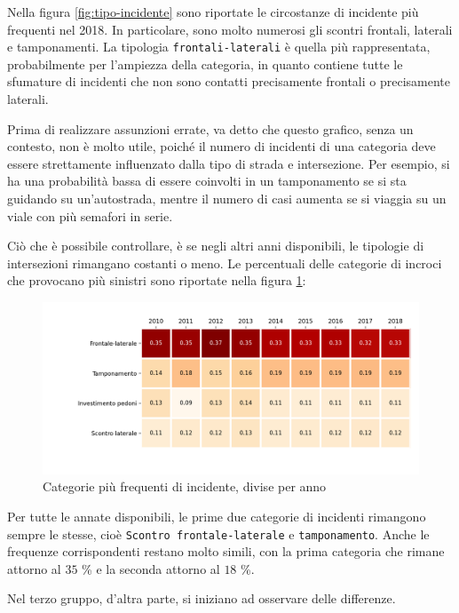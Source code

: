 \documentclass[a4paper,12pt]{report}
\newcommand{\columnstyle}[1]{\texttt{#1}}
\begin{document}
Nella figura \ref{fig:tipo-incidente} sono riportate le circostanze di 
incidente più frequenti nel 2018. 
In particolare, sono molto numerosi gli scontri frontali, laterali e tamponamenti. 
La tipologia \columnstyle{frontali-laterali} è quella più rappresentata, 
probabilmente per l'ampiezza della categoria, in quanto contiene 
tutte le sfumature di incidenti che non sono 
contatti precisamente frontali o precisamente laterali. 

Prima di realizzare assunzioni errate, va detto che questo grafico, senza un contesto, 
non è molto utile, poiché il numero di incidenti di una categoria deve 
essere strettamente influenzato dalla tipo di strada e intersezione. 
Per esempio, si ha una probabilità bassa di essere coinvolti in un tamponamento 
se si sta guidando su un'autostrada, mentre il numero di casi aumenta se si viaggia 
su un viale con più semafori in serie. 

Ciò che è possibile controllare, è se negli altri anni disponibili, le 
tipologie di intersezioni rimangano costanti o meno. 
Le percentuali delle categorie di incroci che provocano più sinistri 
sono riportate nella figura \ref{fig:rapporto-tipologie}: 

\begin{figure}
    \includegraphics[width=\linewidth]{../src/incidenti/incidenti_senza_coords/localizzazione_incidente/rapporto_tipologie.png}
    \caption{Categorie più frequenti di incidente, divise per anno}
    \label{fig:rapporto-tipologie}
\end{figure}

Per tutte le annate disponibili, le prime due categorie di incidenti rimangono sempre 
le stesse, cioè \columnstyle{Scontro frontale-laterale} e \columnstyle{tamponamento}. 
Anche le frequenze corrispondenti restano molto simili, con la prima 
categoria che rimane attorno al $35$ \% e la seconda attorno al $18$ \%. 

Nel terzo gruppo, d'altra parte, si iniziano ad osservare delle differenze. 
\end{document}
